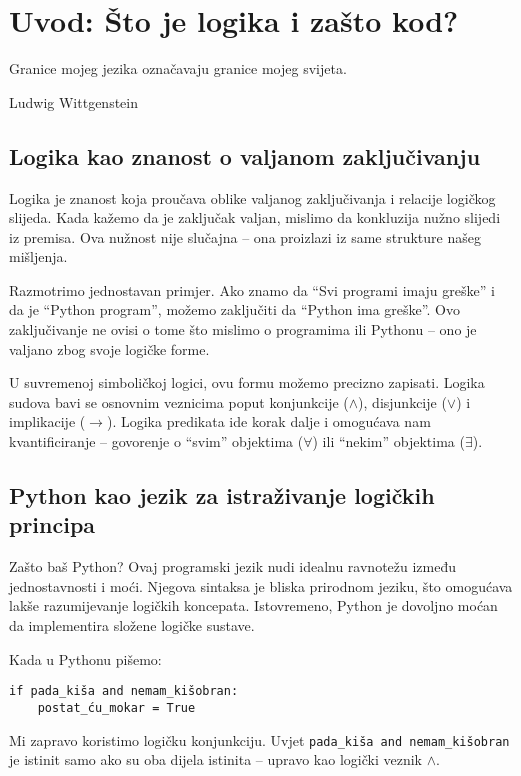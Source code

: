 
\chapter{Uvod: Što je logika i zašto kod?}

\epigraph{Granice mojeg jezika označavaju granice mojeg svijeta.}{Ludwig Wittgenstein}

\section*{Logika kao znanost o valjanom zaključivanju}

Logika je znanost koja proučava oblike valjanog zaključivanja i relacije logičkog slijeda. Kada kažemo da je zaključak valjan, mislimo da konkluzija nužno slijedi iz premisa. Ova nužnost nije slučajna – ona proizlazi iz same strukture našeg mišljenja.

Razmotrimo jednostavan primjer. Ako znamo da ``Svi programi imaju greške'' i da je ``Python program'', možemo zaključiti da ``Python ima greške''. Ovo zaključivanje ne ovisi o tome što mislimo o programima ili Pythonu -- ono je valjano zbog svoje logičke forme.

U suvremenoj simboličkoj logici, ovu formu možemo precizno zapisati. Logika sudova bavi se osnovnim veznicima poput konjunkcije ($\wedge$), disjunkcije ($\vee$) i implikacije ($\rightarrow$). Logika predikata ide korak dalje i omogućava nam kvantificiranje -- govorenje o ``svim'' objektima ($\forall$) ili ``nekim'' objektima ($\exists$).

\section*{Python kao jezik za istraživanje logičkih principa}

Zašto baš Python? Ovaj programski jezik nudi idealnu ravnotežu između jednostavnosti i moći. Njegova sintaksa je bliska prirodnom jeziku, što omogućava lakše razumijevanje logičkih koncepata. Istovremeno, Python je dovoljno moćan da implementira složene logičke sustave.

Kada u Pythonu pišemo:
\begin{verbatim}
if pada_kiša and nemam_kišobran:
    postat_ću_mokar = True
\end{verbatim}

Mi zapravo koristimo logičku konjunkciju. Uvjet \texttt{pada\_kiša and nemam\_kišobran} je istinit samo ako su oba dijela istinita -- upravo kao logički veznik $\wedge$.

